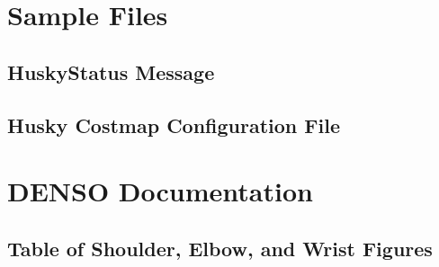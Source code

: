 \chapter{Sample Files}
\section{HuskyStatus Message}
\label{app:huskystatus}
\section{Husky Costmap Configuration File}
\label{app:huskyconfig}
\chapter{DENSO Documentation}
\section{Table of Shoulder, Elbow, and Wrist Figures}
\label{sec:fig}
